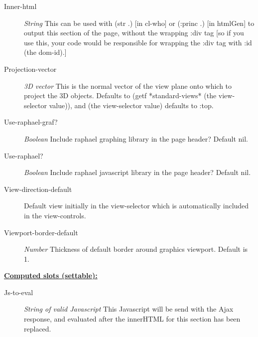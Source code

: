 \documentclass [11pt]{book}
\begin{document}
\begin{itemize}
\begin{description}
\item [Inner-html]
\emph{String} This can be used with (str .) [in cl-who] or (:princ .) [in htmlGen]
to output this section of the page, without the wrapping :div tag [so if you use this,
your code would be responsible for wrapping the :div tag with :id (the dom-id).]


\item [Projection-vector]
\emph{3D vector} This is the normal vector of the view plane onto
which to project the 3D objects. Defaults to
(getf *standard-views* (the view-selector value)),
and (the view-selector value) defaults to :top.


\item [Use-raphael-graf?]
\emph{Boolean} Include raphael graphing library in the page header?
Default nil.


\item [Use-raphael?]
\emph{Boolean} Include raphael javascript library in the page header?
Default nil.


\item [View-direction-default]
Default view initially in the view-selector which is
automatically included in the view-controls.


\item [Viewport-border-default]
\emph{Number} Thickness of default border around graphics viewport.
Default is 1.


\end{description}






\textbf{
\underline{Computed slots (settable):}}

\begin{description}

\item [Js-to-eval]
\emph{String of valid Javascript} This Javascript will be send with the Ajax response,
and evaluated after the innerHTML for this section has been replaced.


\end{description}







\end{itemize}
\end{document}
